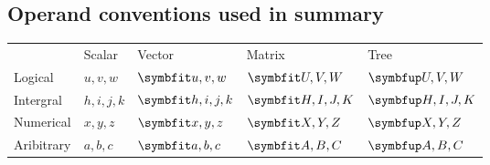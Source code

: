 \subsection{Operand conventions used in summary}
\begin{tabularx}{\textwidth}{ l l l l l }
		& Scalar
		& Vector
		& Matrix
		& Tree
		\\
	Logical
		& \( u,v,w \)
		& \( \vect{u,v,w} \)
		& \( \mat{U,V,W} \)
		& \( \tree{U,V,W} \)
		\\
	Intergral
		& \( h,i,j,k \)
		& \( \vect{h,i,j,k} \)
		& \( \mat{H,I,J,K} \)
		& \( \tree{H,I,J,K} \)
		\\
	Numerical
		& \( x,y,z \)
		& \( \vect{x,y,z} \)
		& \( \mat{X,Y,Z} \)
		& \( \tree{X,Y,Z} \)
		\\
	Aribitrary
		& \( a,b,c \)
		& \( \vect{a,b,c} \)
		& \( \mat{A,B,C} \)
		& \( \tree{A,B,C} \)
		\\
\end{tabularx}

